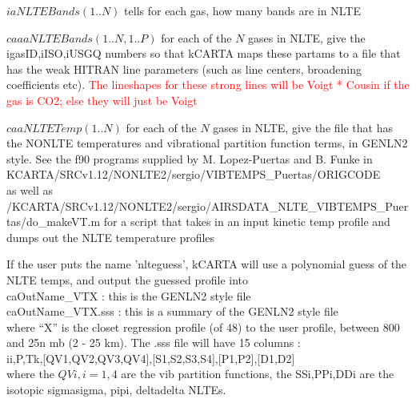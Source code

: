 \documentclass[12pt]{article}
\begin{document}
{{\noindent $iaNLTEBands(1..N)$ tells for each gas, how many bands are in NLTE

\noindent $caaaNLTEBands(1..N,1..P)$ for each of the $N$ gases in NLTE, give
the igasID,iISO,iUSGQ numbers so that kCARTA maps these partams to a file
that has the weak HITRAN line parameters (such as line centers, 
broadening coefficients etc).
\textcolor{red}
{The lineshapes for these strong lines will be Voigt * Cousin if the gas is 
CO2; else they will just be Voigt}

\noindent $caaNLTETemp(1..N)$ for each of the $N$ gases in NLTE, give
the file that has the NONLTE temperatures and vibrational partition function 
terms, in GENLN2 style. 
See the f90 programs supplied by M. Lopez-Puertas and B. Funke in
  KCARTA/SRCv1.12/NONLTE2/sergio/VIBTEMPS\_Puertas/ORIGCODE \\
as well as \\
 /KCARTA/SRCv1.12/NONLTE2/sergio/AIRSDATA\_NLTE\_VIBTEMPS\_Puertas/do\_makeVT.m
for a script that takes in an input kinetic temp profile and dumps out the
NLTE temperature profiles

If the user puts the name 'nlteguess', kCARTA will use a polynomial guess
of the NLTE temps, and output the guessed profile into \\
   caOutName\_VTX     : this is the GENLN2 style file \\
   caOutName\_VTX.sss : this is a summary of the GENLN2 style file \\
where ``X'' is the closet regression profile (of 48) to the user profile, 
between 800 and 25n mb (2 - 25 km). The .sss file will have 15 columns : \\
   ii,P,Tk,[QV1,QV2,QV3,QV4],[S1,S2,S3,S4],[P1,P2],[D1,D2] \\
where the $QV{i},i=1,4$ are the vib partition functions, the SSi,PPi,DDi are 
the isotopic sigmasigma, pipi, deltadelta NLTEs.

}}
\end{document}
